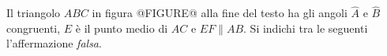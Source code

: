 Il triangolo $ABC$ in figura @FIGURE@ alla fine del testo
ha gli angoli $\widehat A$ e $\widehat B$ congruenti, 
$E$ è il punto medio di $AC$ e $EF \| AB$.
Si indichi tra le seguenti l'affermazione \emph{falsa}.